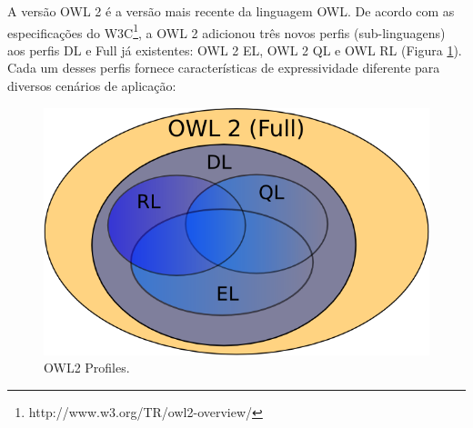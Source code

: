 A versão \foreignlanguage{english}{OWL} 2 é a versão mais recente
da linguagem \foreignlanguage{english}{OWL}. De acordo com as especificações
do W3C\footnote{http://www.w3.org/TR/owl2-overview/}, a \foreignlanguage{english}{OWL
2} adicionou três novos perfis (\foreignlanguage{english}{sub-linguagens})
aos perfis DL e \foreignlanguage{english}{Full} já existentes: \foreignlanguage{english}{OWL
2} EL,\foreignlanguage{english}{ OWL 2 QL} e \foreignlanguage{english}{OWL
RL} (Figura \ref{fig:OWL2-Profiles}). Cada um desses perfis fornece
características de expressividade diferente para diversos cenários
de aplicação:

\begin{figure}[H]
\begin{centering}
\includegraphics[width=0.8\columnwidth]{figures/owl2Profiles}
\par\end{centering}
\caption{OWL2 Profiles.\label{fig:OWL2-Profiles}}
\end{figure}

